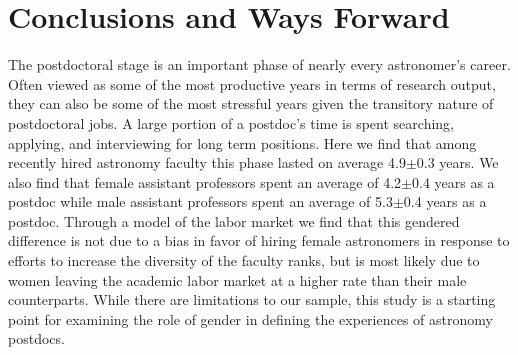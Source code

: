 \documentclass[modern]{aastex62}
\begin{document}

\section{Conclusions and Ways Forward}
The postdoctoral stage is an important phase of nearly every astronomer's career. Often viewed as some of the most productive years in terms of research output, they can also be some of the most stressful years given the transitory nature of postdoctoral jobs. A large portion of a postdoc's time is spent searching, applying, and interviewing for long term positions. Here we find that among recently hired astronomy faculty this phase lasted on average 4.9$\pm$0.3 years. We also find that female assistant professors spent an average of 4.2$\pm$0.4 years as a postdoc while male assistant professors spent an average of 5.3$\pm$0.4 years as a postdoc. Through a model of the labor market we find that this gendered difference is not due to a bias in favor of hiring female astronomers in response to efforts to increase the diversity of the faculty ranks, but is most likely due to women leaving the academic labor market at a higher rate than their male counterparts. While there are limitations to our sample, this study is a starting point for examining the role of gender in defining the experiences of astronomy postdocs. 
\end{document}
